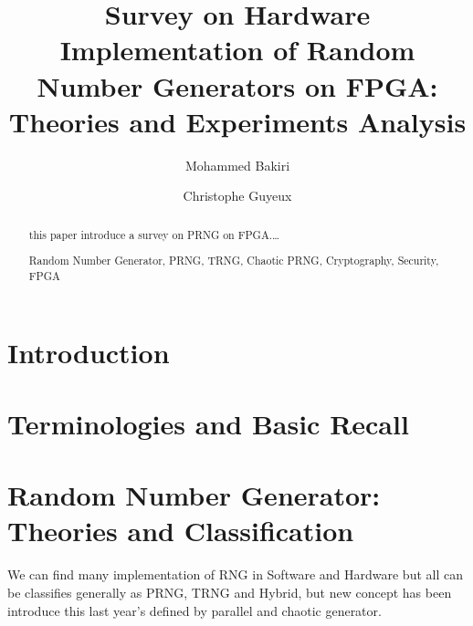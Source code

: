 \documentclass[English, runningheads,a4paper]{llncs}
\newcommand{\keywords}[1]{\par\addvspace\baselineskip
\noindent\keywordname\enspace\ignorespaces#1}
\begin{document}
\mainmatter  %

\title{Survey on Hardware Implementation of Random Number Generators on FPGA: Theories and Experiments Analysis}


\author{Mohammed Bakiri \and Christophe Guyeux}



\maketitle

\begin{abstract}
this paper introduce a survey on PRNG on FPGA.\dots

\keywords{Random Number Generator, PRNG, TRNG, Chaotic PRNG, Cryptography, Security, FPGA}
\end{abstract}

\section{Introduction}


\section{Terminologies and Basic Recall}


\section{Random Number Generator: Theories and Classification}
We can find many implementation of RNG in Software and Hardware but all can be classifies generally as PRNG, TRNG and  Hybrid,  but new concept has been introduce this last year's defined by parallel and chaotic generator.
\end{document}
